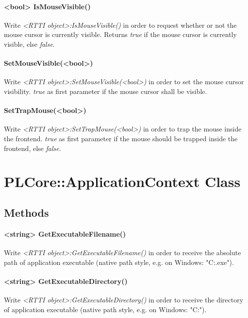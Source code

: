 \paragraph{<bool> IsMouseVisible()}
Write \emph{<RTTI object>:IsMouseVisible()} in order to request whether or not the mouse cursor is currently visible. Returns \emph{true} if the mouse cursor is currently visible, else \emph{false}.

\paragraph{SetMouseVisible(<bool>)}
Write \emph{<RTTI object>:SetMouseVisible(<bool>)} in order to set the mouse cursor visibility. \emph{true} as first parameter if the mouse cursor shall be visible.

\paragraph{SetTrapMouse(<bool>)}
Write \emph{<RTTI object>:SetTrapMouse(<bool>)} in order to trap the mouse inside the frontend. \emph{true} as first parameter if the mouse should be trapped inside the frontend, else \emph{false}.




\section{PLCore::ApplicationContext Class}


\subsection{Methods}

\paragraph{<string> GetExecutableFilename()}
Write \emph{<RTTI object>:GetExecutableFilename()} in order to receive the absolute path of application executable (native path style, e.g. on Windows: "C:\MyApplication{}\Test.exe").

\paragraph{<string> GetExecutableDirectory()}
Write \emph{<RTTI object>:GetExecutableDirectory()} in order to receive the directory of application executable (native path style, e.g. on Windows: "C:\MyApplication{}").

